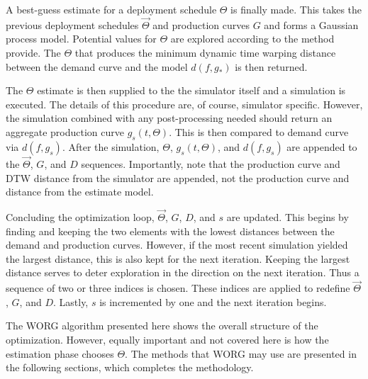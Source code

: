 A best-guess estimate for a deployment schedule $\Theta$ is finally 
made.  This takes the previous deployment schedules $\vec{\Theta}$ and
production curves $G$ and forms a Gaussian process model. Potential 
values for $\Theta$ are explored according to the method provide.  The 
$\Theta$ that produces the minimum dynamic time warping distance between
the demand curve and the model $d(f, g_*)$ is then returned.

The $\Theta$ estimate is then supplied to the the simulator itself and 
a simulation is executed.  The details of this procedure are, of course,
simulator specific.  However, the simulation combined with any post-processing 
needed should return an aggregate production curve $g_s(t, \Theta)$.  
This is then compared to demand curve via $d(f, g_s)$. After the simulation, 
$\Theta$, $g_s(t, \Theta)$, and $d(f, g_s)$ are appended to the 
$\vec{\Theta}$, $G$, and $D$ sequences.  Importantly, note that the 
production curve and DTW distance from the simulator are appended, 
not the production curve and distance from the estimate model.

Concluding the optimization loop, $\vec{\Theta}$, $G$, $D$, and $s$ are
updated.  This begins by finding and keeping the two elements with the 
lowest distances between the demand and production curves.  However, 
if the most recent simulation yielded the largest distance, this is also
kept for the next iteration. Keeping the largest distance serves to deter
exploration in the direction on the next iteration.  Thus a sequence of 
two or three indices is chosen. These indices are applied to redefine
$\vec{\Theta}$, $G$, and $D$. Lastly, $s$ is incremented by one and the
next iteration begins.

The WORG algorithm presented here shows the overall structure of the 
optimization.  However, equally important and not covered here is how the
estimation phase chooses $\Theta$.  The methods that WORG may use are 
presented in the following sections, which completes the methodology. 
